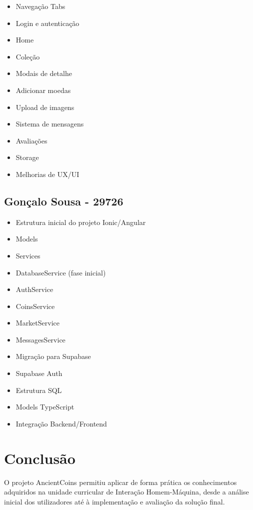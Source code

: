 \documentclass[12pt,a4paper]{article}
\begin{document}
\begin{itemize}
\setlength{\itemsep}{0.15em}
\item Navegação Tabs
\item Login e autenticação
\item Home
\item Coleção
\item Modais de detalhe
\item Adicionar moedas
\item Upload de imagens
\item Sistema de mensagens
\item Avaliações
\item Storage
\item Melhorias de UX/UI
\end{itemize}

\subsection{Gonçalo Sousa - 29726}

\begin{itemize}
\setlength{\itemsep}{0.15em}
\item Estrutura inicial do projeto Ionic/Angular
\item Models
\item Services
\item DatabaseService (fase inicial)
\item AuthService
\item CoinsService
\item MarketService
\item MessagesService
\item Migração para Supabase
\item Supabase Auth
\item Estrutura SQL
\item Models TypeScript
\item Integração Backend/Frontend
\end{itemize}

\section*{Conclusão}

O projeto AncientCoins permitiu aplicar de forma prática os conhecimentos adquiridos na unidade curricular de Interação Homem-Máquina, desde a análise inicial dos utilizadores até à implementação e avaliação da solução final.
\end{document}

